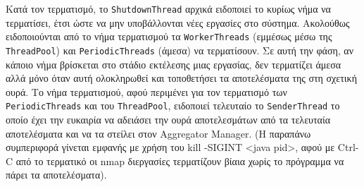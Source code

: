 \documentclass[a4paper,11pt]{article}
\begin{document}
\begin{sloppypar}
Κατά τον τερματισμό, το \texttt{ShutdownThread} αρχικά ειδοποιεί το κυρίως νήμα να τερματίσει, έτσι ώστε να μην υποβάλλονται νέες εργασίες στο σύστημα. Ακολούθως ειδοποιούνται από το νήμα τερματισμού τα \texttt{WorkerThreads} (εμμέσως μέσω της \texttt{ThreadPool}) και \texttt{PeriodicThreads} (άμεσα) να τερματίσουν. Σε αυτή την φάση, αν κάποιο νήμα βρίσκεται στο στάδιο εκτέλεσης μιας εργασίας, δεν τερματίζει άμεσα αλλά μόνο όταν αυτή ολοκληρωθεί και τοποθετήσει τα αποτελέσματα της στη σχετική ουρά. Το νήμα τερματισμού, αφού περιμένει για τον τερματισμό των \texttt{PeriodicThreads} και του \texttt{ThreadPool}, ειδοποιεί τελευταίο το \texttt{SenderThread} το οποίο έχει την ευκαιρία να αδειάσει την ουρά αποτελεσμάτων από τα τελευταία αποτελέσματα και να τα στείλει στον Aggregator Manager. (Η παραπάνω συμπεριφορά γίνεται εμφανής με χρήση του kill -SIGINT <java pid>, αφού με Ctrl-C από το τερματικό οι nmap διεργασίες τερματίζουν βίαια χωρίς το πρόγραμμα να πάρει τα αποτελέσματα).

\end{sloppypar}
\end{document}
